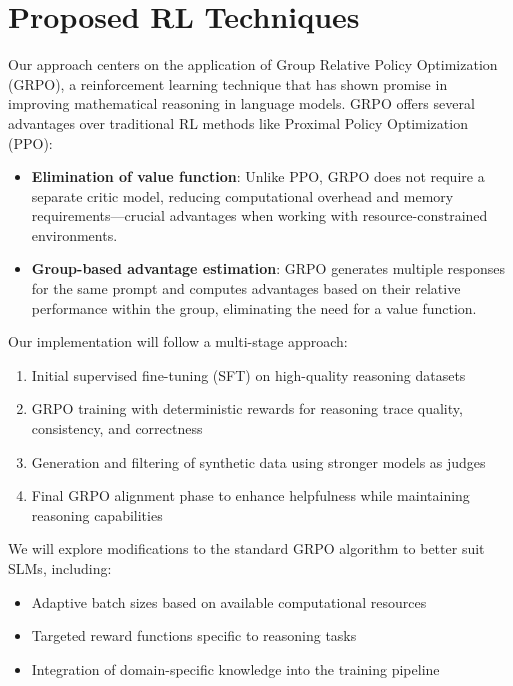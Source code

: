 \documentclass[11pt, oneside]{article}   	%
\begin{document}
\section*{Proposed RL Techniques}

Our approach centers on the application of Group Relative Policy Optimization (GRPO), a reinforcement learning technique that has shown promise in improving mathematical reasoning in language models. GRPO offers several advantages over traditional RL methods like Proximal Policy Optimization (PPO):

\begin{itemize}
	\item \textbf{Elimination of value function}: Unlike PPO, GRPO does not require a separate critic model, reducing computational overhead and memory requirements—crucial advantages when working with resource-constrained environments.

	\item \textbf{Group-based advantage estimation}: GRPO generates multiple responses for the same prompt and computes advantages based on their relative performance within the group, eliminating the need for a value function.
\end{itemize}

Our implementation will follow a multi-stage approach:
\begin{enumerate}
	\item Initial supervised fine-tuning (SFT) on high-quality reasoning datasets
	\item GRPO training with deterministic rewards for reasoning trace quality, consistency, and correctness
	\item Generation and filtering of synthetic data using stronger models as judges
	\item Final GRPO alignment phase to enhance helpfulness while maintaining reasoning capabilities
\end{enumerate}

We will explore modifications to the standard GRPO algorithm to better suit SLMs, including:
\begin{itemize}
	\item Adaptive batch sizes based on available computational resources
	\item Targeted reward functions specific to reasoning tasks
	\item Integration of domain-specific knowledge into the training pipeline
\end{itemize}
\end{document}
